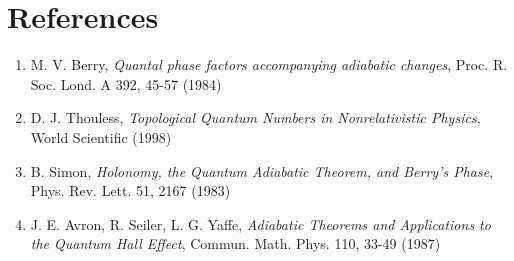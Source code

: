 \documentclass{article}
\begin{document}
\section{References}

\begin{enumerate}
    \item M. V. Berry, \textit{Quantal phase factors accompanying adiabatic changes}, Proc. R. Soc. Lond. A 392, 45-57 (1984)
    
    \item D. J. Thouless, \textit{Topological Quantum Numbers in Nonrelativistic Physics}, World Scientific (1998)
    
    \item B. Simon, \textit{Holonomy, the Quantum Adiabatic Theorem, and Berry's Phase}, Phys. Rev. Lett. 51, 2167 (1983)
    
    \item J. E. Avron, R. Seiler, L. G. Yaffe, \textit{Adiabatic Theorems and Applications to the Quantum Hall Effect}, Commun. Math. Phys. 110, 33-49 (1987)
\end{enumerate}
\end{document}
